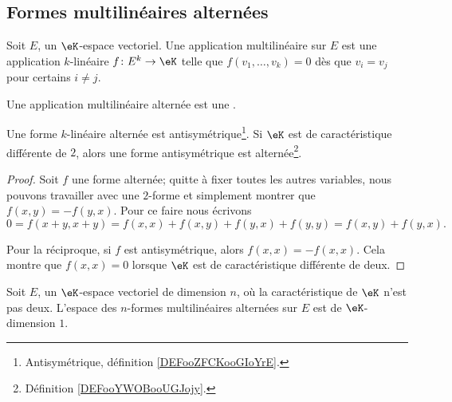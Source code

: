 \subsection{Formes multilinéaires alternées}


\begin{definition}       \label{DEFooYWOBooUGJojy}
	Soit \( E\), un \( \eK\)-espace vectoriel. Une application multilinéaire  sur \( E\) est une application \( k\)-linéaire \( f\colon E^k\to \eK\) telle que \( f(v_1,\ldots, v_k)=0\) dès que \( v_i=v_j\) pour certains \( i\neq j\).

	Une application multilinéaire alternée est une .
\end{definition}


\begin{lemma}   \label{LemHiHNey}
	Une forme \( k\)-linéaire alternée est antisymétrique\footnote{Antisymétrique, définition \ref{DEFooZFCKooGIoYrE}.}. Si \( \eK\) est de caractéristique différente de \( 2\), alors une forme antisymétrique est alternée\footnote{Définition \ref{DEFooYWOBooUGJojy}.}.
\end{lemma}

\begin{proof}
	Soit \( f\) une forme alternée; quitte à fixer toutes les autres variables, nous pouvons travailler avec une \( 2\)-forme et simplement montrer que \( f(x,y)=-f(y,x)\). Pour ce faire nous écrivons
	\begin{equation}
		0=f(x+y,x+y)=f(x,x)+f(x,y)+f(y,x)+f(y,y)=f(x,y)+f(y,x).
	\end{equation}

	Pour la réciproque, si \( f\) est antisymétrique, alors \( f(x,x)=-f(x,x)\). Cela montre que \( f(x,x)=0\) lorsque \( \eK\) est de caractéristique différente de deux.
\end{proof}

\begin{proposition} \label{ProprbjihK}
	Soit \( E\), un \( \eK\)-espace vectoriel de dimension \( n\), où la caractéristique de \( \eK\) n'est pas deux. L'espace des \( n\)-formes multilinéaires alternées sur \( E\) est de \( \eK\)-dimension \( 1\).
\end{proposition}

